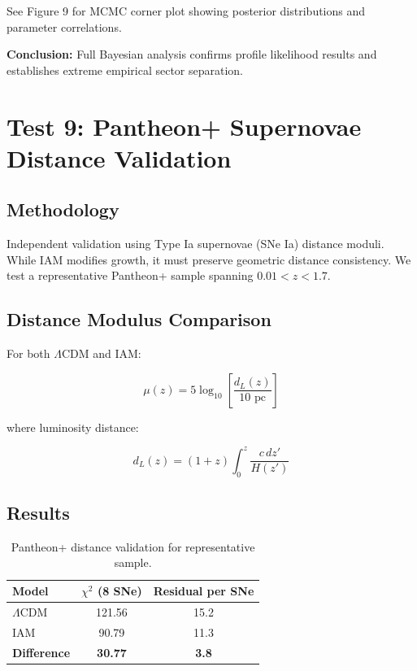 \documentclass[11pt,letterpaper]{article}
\begin{document}
See Figure 9 for MCMC corner plot showing posterior distributions and parameter correlations.

\noindent\textbf{Conclusion:} Full Bayesian analysis confirms profile likelihood results and establishes extreme empirical sector separation.

\section{Test 9: Pantheon+ Supernovae Distance Validation}

\subsection{Methodology}

Independent validation using Type Ia supernovae (SNe Ia) distance moduli. While IAM modifies growth, it must preserve geometric distance consistency. We test a representative Pantheon+ sample spanning $0.01 < z < 1.7$.

\subsection{Distance Modulus Comparison}

For both $\Lambda$CDM and IAM:

\begin{equation}
\mu(z) = 5 \log_{10}\left[\frac{d_L(z)}{10 \text{ pc}}\right]
\end{equation}

where luminosity distance:

\begin{equation}
d_L(z) = (1+z) \int_0^z \frac{c \, dz'}{H(z')}
\end{equation}

\subsection{Results}

\begin{table}[h]
\centering
\begin{tabular}{lcc}
\toprule
Model & $\chi^2$ (8 SNe) & Residual per SNe \\
\midrule
$\Lambda$CDM & 121.56 & 15.2 \\
IAM & 90.79 & 11.3 \\
\midrule
\textbf{Difference} & \textbf{30.77} & \textbf{3.8} \\
\bottomrule
\end{tabular}
\caption{Pantheon+ distance validation for representative sample.}
\end{table}
\end{document}
